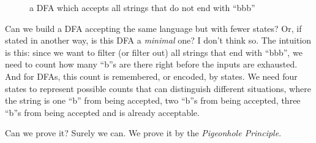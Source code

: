 \documentclass[11pt]{article}
\begin{document}
\begin{figure}[ht]
    \centering
    \caption{a DFA which accepts all strings that do not end with ``bbb''}
    \label{fig:fig3}
\end{figure}

Can we build a DFA accepting the same language but with fewer states? Or, if stated in another way, is this DFA a \emph{minimal} one? I don't think so. The intuition is
this: since we want to filter (or filter out) all strings that end with ``bbb'', we
need to count how many ``b''s are there right before the inputs are exhausted. And for
DFAs, this count is remembered, or encoded, by states. We need four states to
represent possible counts that can distinguish different situations, where the
string is one ``b'' from being accepted, two ``b''s from being accepted, three ``b''s from
being accepted and is already acceptable.

Can we prove it? Surely we can. We prove it by the \emph{Pigeonhole Principle}.
\end{document}
